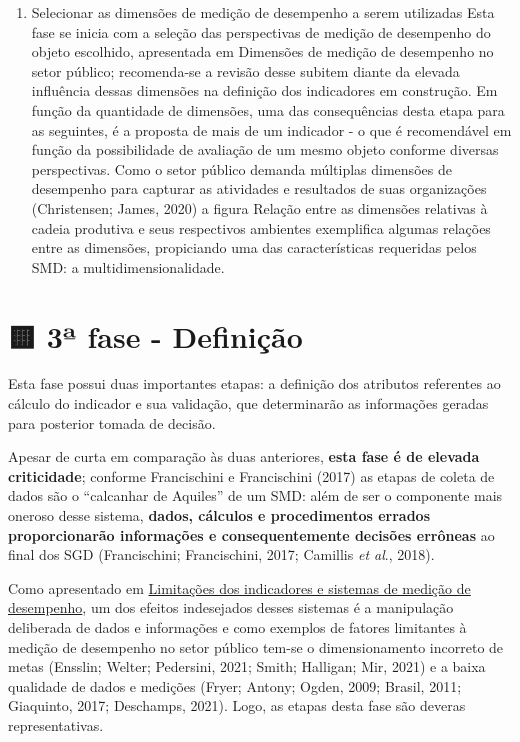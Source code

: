 \documentclass[
  letterpaper,
  DIV=11,
  numbers=noendperiod]{scrreprt}
\providecommand{\tightlist}{%
  \setlength{\itemsep}{0pt}\setlength{\parskip}{0pt}}\usepackage{longtable,booktabs,array}
\begin{document}
\begin{enumerate}
\def\labelenumi{\arabic{enumi}.}
\setcounter{enumi}{4}
\tightlist
\item
  Selecionar as dimensões de medição de desempenho a serem utilizadas
  Esta fase se inicia com a seleção das perspectivas de medição de
  desempenho do objeto escolhido, apresentada em Dimensões de medição de
  desempenho no setor público; recomenda-se a revisão desse subitem
  diante da elevada influência dessas dimensões na definição dos
  indicadores em construção. Em função da quantidade de dimensões, uma
  das consequências desta etapa para as seguintes, é a proposta de mais
  de um indicador - o que é recomendável em função da possibilidade de
  avaliação de um mesmo objeto conforme diversas perspectivas. Como o
  setor público demanda múltiplas dimensões de desempenho para capturar
  as atividades e resultados de suas organizações (Christensen; James,
  2020) a figura Relação entre as dimensões relativas à cadeia produtiva
  e seus respectivos ambientes exemplifica algumas relações entre as
  dimensões, propiciando uma das características requeridas pelos SMD: a
  multidimensionalidade.
\end{enumerate}

\hypertarget{uxaa-fase---definiuxe7uxe3o}{%
\chapter*{🟨 3ª fase - Definição}\label{uxaa-fase---definiuxe7uxe3o}}


{Esta fase possui duas importantes etapas: a definição dos atributos
referentes ao cálculo do indicador e sua validação, que determinarão as
informações geradas para posterior tomada de decisão.}

Apesar de curta em comparação às duas anteriores, \textbf{esta fase é de
elevada criticidade}; conforme Francischini e Francischini (2017) as
etapas de coleta de dados são o ``calcanhar de Aquiles'' de um SMD: além
de ser o componente mais oneroso desse sistema, \textbf{dados, cálculos
e procedimentos errados proporcionarão informações e consequentemente
decisões errôneas} ao final dos SGD (Francischini; Francischini, 2017;
Camillis \emph{et al}., 2018).

Como apresentado em
\href{/o/AZWDclIWFqqJuBEvyQWk/s/ws6bIBOPv2tLRHdwbB7y/~/changes/788/1.-apresentacao/1.4-consequencias-indesejadas-e-limitacoes-da-medicao-de-desempenho}{Limitações
dos indicadores e sistemas de medição de desempenho}, um dos efeitos
indesejados desses sistemas é a manipulação deliberada de dados e
informações e como exemplos de fatores limitantes à medição de
desempenho no setor público tem-se o dimensionamento incorreto de metas
(Ensslin; Welter; Pedersini, 2021; Smith; Halligan; Mir, 2021) e a baixa
qualidade de dados e medições (Fryer; Antony; Ogden, 2009; Brasil, 2011;
Giaquinto, 2017; Deschamps, 2021). Logo, as etapas desta fase são
deveras representativas.
\end{document}
